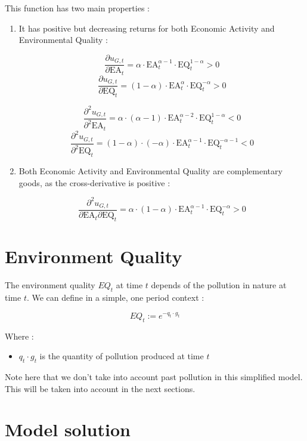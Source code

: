 \documentclass{article}
\begin{document}
This function has two main properties : 

\begin{enumerate}
    \item It has positive but decreasing returns for both Economic Activity and Environmental Quality : 

$$\frac{\partial u_{G,t}}{\partial \text{EA}_{t}}=\alpha\cdot\text{EA}_{t}^{\alpha-1}\cdot\text{EQ}_{t}^{1-\alpha}>0$$
$$\frac{\partial u_{G,t}}{\partial \text{EQ}_{t}}=(1-\alpha)\cdot\text{EA}_{t}^{\alpha}\cdot\text{EQ}_{t}^{-\alpha}>0$$

$$\frac{\partial^2 u_{G,t}}{\partial^2 \text{EA}_{t}}=\alpha\cdot(\alpha-1)\cdot\text{EA}_{t}^{\alpha-2}\cdot\text{EQ}_{t}^{1-\alpha}<0$$
$$\frac{\partial^2 u_{G,t}}{\partial^2 \text{EQ}_{t}}=(1-\alpha)\cdot(-\alpha)\cdot\text{EA}_{t}^{\alpha-1}\cdot\text{EQ}_{t}^{-\alpha-1}<0$$

    \item Both Economic Activity and Environmental Quality are complementary goods, as the cross-derivative is positive :
    
$$\frac{\partial^2 u_{G,t}}{\partial \text{EA}_{t} \partial \text{EQ}_{t}}=\alpha\cdot(1-\alpha)\cdot\text{EA}_{t}^{\alpha-1}\cdot\text{EQ}_{t}^{-\alpha}>0$$
\end{enumerate}

\section{Environment Quality}

The environment quality $EQ_{t}$ at time $t$ depends of the pollution in nature at time $t$. We can define in a simple, one period context : 

\begin{equation}
    EQ_{t}:=e^{-q_{t}\cdot g_{t}}
\end{equation}

Where :
\begin{itemize}
    \item $q_{t}\cdot g_{t}$ is the quantity of pollution produced at time $t$
\end{itemize}

Note here that we don't take into account past pollution in this simplified model. This will be taken into account in the next sections. 

\section{Model solution}
\end{document}
